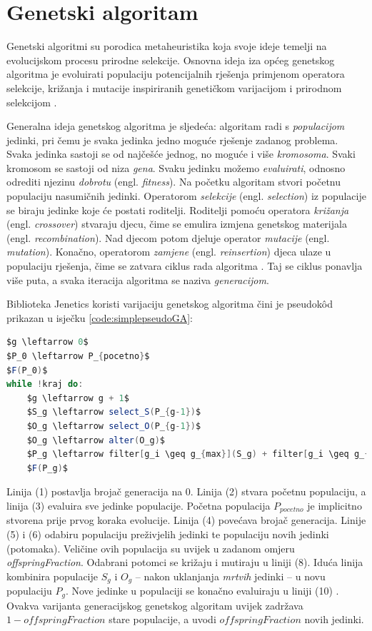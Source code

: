 \documentclass[times, utf8, zavrsni]{fer}
\begin{document}
\section{Genetski algoritam}\label{genetski algoritam}
Genetski algoritmi su porodica metaheuristika koja svoje ideje temelji na evolucijskom procesu prirodne selekcije. Osnovna ideja iza općeg genetskog algoritma je evoluirati populaciju potencijalnih rješenja primjenom operatora selekcije, križanja i mutacije inspiriranih genetičkom varijacijom i prirodnom selekcijom \citep{mitchell1998introduction}.

Generalna ideja genetskog algoritma je sljedeća: algoritam radi s \textit{populacijom} jedinki, pri čemu je svaka jedinka jedno moguće rješenje zadanog problema. Svaka jedinka sastoji se od najčešće jednog, no moguće i više \textit{kromosoma}. Svaki kromosom se sastoji od niza \textit{gena}. Svaku jedinku možemo \textit{evaluirati}, odnosno odrediti njezinu \textit{dobrotu} (engl. \textit{fitness}). Na početku algoritam stvori početnu populaciju nasumičnih jedinki. Operatorom \textit{selekcije} (engl. \textit{selection}) iz populacije se biraju jedinke koje će postati roditelji. Roditelji pomoću operatora \textit{križanja} (engl. \textit{crossover}) stvaraju djecu, čime se emulira izmjena genetskog materijala (engl. \textit{recombination}). Nad djecom potom djeluje operator \textit{mutacije} (engl. \textit{mutation}). Konačno, operatorom \textit{zamjene} (engl. \textit{reinsertion}) djeca ulaze u populaciju rješenja, čime se zatvara ciklus rada algoritma \citep{book:cupic_optjava}. Taj se ciklus ponavlja više puta, a svaka iteracija algoritma se naziva \textit{generacijom}.

Biblioteka Jenetics koristi varijaciju genetskog algoritma čini je pseudok{\^o}d prikazan u isječku \ref{code:simplepseudoGA}:

\begin{lstlisting}[language=java, caption=Genetski algoritam, label={code:simplepseudoGA}, mathescape]
$g \leftarrow 0$
$P_0 \leftarrow P_{pocetno}$
$F(P_0)$
while !kraj do:
	$g \leftarrow g + 1$
	$S_g \leftarrow select_S(P_{g-1})$
	$O_g \leftarrow select_O(P_{g-1})$
	$O_g \leftarrow alter(O_g)$
	$P_g \leftarrow filter[g_i \geq g_{max}](S_g) + filter[g_i \geq g_{max}](O_g)$
	$F(P_g)$
\end{lstlisting}

Linija (1) postavlja brojač generacija na 0. Linija (2) stvara početnu populaciju, a linija (3) evaluira sve jedinke populacije. Početna populacija $P_{pocetno}$ je implicitno stvorena prije prvog koraka evolucije. Linija (4) povećava brojač generacija. Linije (5) i (6) odabiru populaciju preživjelih jedinki te populaciju novih jedinki (potomaka). Veličine ovih populacija su uvijek u zadanom omjeru \textit{offspringFraction}. Odabrani potomci se križaju i mutiraju u liniji (8). Iduća linija kombinira populacije $S_g$ i $O_g$ -- nakon uklanjanja \textit{mrtvih} jedinki -- u novu populaciju $P_g$. Nove jedinke u populaciji se konačno evaluiraju u liniji (10) \citep{jenetics_userguide}. Ovakva varijanta generacijskog genetskog algoritam uvijek zadržava $1-offspringFraction$ stare populacije, a uvodi $offspringFraction$ novih jedinki.
\end{document}
